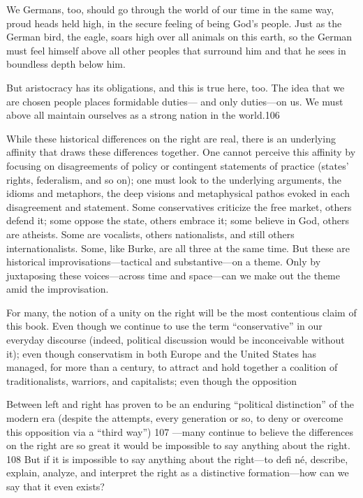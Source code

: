  \par 
We Germans, too, should go through the world of our time in the same way, proud heads held high, in the secure feeling of being God’s people. Just as the German bird, the eagle, soars high over all animals on this earth, so the German must feel himself above all other peoples that surround him and that he sees in boundless depth below him.
 \par 
But aristocracy has its obligations, and this is true here, too. The idea that we are chosen people places formidable duties— and only duties—on us. We must above all maintain ourselves as a strong nation in the world.{\color{blue}106}
 \par 
While these historical differences on the right are real, there is an underlying affinity that draws these differences together. One cannot perceive this affinity by focusing on disagreements of policy or contingent statements of practice (states’ rights, federalism, and so on); one must look to the underlying arguments, the idioms and metaphors, the deep visions and metaphysical pathos evoked in each disagreement and statement. Some conservatives criticize the free market, others defend it; some oppose the state, others embrace it; some believe in God, others are atheists. Some are vocalists, others nationalists, and still others internationalists. Some, like Burke, are all three at the same time. But these are historical improvisations—tactical and substantive—on a theme. Only by juxtaposing these voices—across time and space—can we make out the theme amid the improvisation.
 \par 
For many, the notion of a unity on the right will be the most contentious claim of this book. Even though we continue to use the term “conservative” in our everyday discourse (indeed, political discussion would be inconceivable without it); even though conservatism in both Europe and the United States has managed, for more than a century, to attract and hold together a coalition of traditionalists, warriors, and capitalists; even though the opposition
 \par 
Between left and right has proven to be an enduring “political distinction” of the modern era (despite the attempts, every generation or so, to deny or overcome this opposition via a “third way”) {\color{blue}107} —many continue to believe the differences on the right are so great it would be impossible to say anything about the right. {\color{blue}108} But if it is impossible to say anything about the right—to defi né, describe, explain, analyze, and interpret the right as a distinctive formation—how can we say that it even exists?
